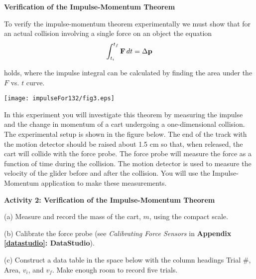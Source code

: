 \textbf{Verification of the Impulse-Momentum Theorem} 

To verify the impulse-momentum theorem experimentally we must show that for
an actual collision involving a single force on an object the equation
\[
\int_{t_{i}}^{t_{f}}{\bf F}\,dt=\Delta {\bf p}\]


holds, where the impulse integral can be calculated by finding the area under
the  $F$ vs. $t$ curve.

\vspace{0.3cm}
{\par\centering \texttt{[image: impulseFor132/fig3.eps]} \par}
\vspace{0.3cm}

In this experiment you will investigate this theorem by measuring the impulse
and the change in momentum of a cart undergoing a one-dimensional collision.
The experimental setup is shown in the figure below. The end of the track with
the motion detector should be raised about 1.5 cm so that, when released, the
cart will collide with the force probe. The force probe will measure the force
as a function of time during the collision. The motion detector is used to measure
the velocity of the glider before and after the collision. You will use the
Impulse-Momentum application to make these measurements.

\vspace{0.3cm}
{\par\centering {} \par}
\vspace{0.3cm}

\textbf{Activity  2: Verification of the Impulse-Momentum Theorem} 

(a) Measure and record the mass of the cart, $m$, using the compact scale.
\vspace{10mm}

(b) Calibrate the force probe (see \textit{Calibrating Force Sensors} in \textbf{Appendix \ref{datastudio}: DataStudio}). 

(c) Construct a data table in the space below with the column headings Trial
\#, Area, \( v_{i} \), and \( v_{f} \). Make enough room to record five trials.

